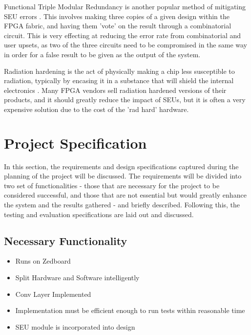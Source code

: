\documentclass[12pt]{article}
\begin{document}
Functional Triple Modular Redundancy is another popular method of mitigating SEU errors \cite{FTripleMR}. This involves making three copies of a given design within the FPGA fabric, and having them 'vote' on the result through a combinatorial circuit. This is very effecting at reducing the error rate from combinatorial and user upsets, as two of the three circuits need to be compromised in the same way in order for a false result to be given as the output of the system.

Radiation hardening is the act of physically making a chip less susceptible to radiation, typically by encasing it in a substance that will shield the internal electronics \cite{RadHardFpga}. Many FPGA vendors sell radiation hardened versions of their products, and it should greatly reduce the impact of SEUs, but it is often a very expensive solution due to the cost of the 'rad hard' hardware.

\newpage

\section{Project Specification}
\label{sec:ProjSpec}


In this section, the requirements and design specifications captured during the planning of the project will be discussed. The requirements will be divided into two set of functionalities - those that are necessary for the project to be considered successful, and those that are not essential but would greatly enhance the system and the results gathered - and briefly described. Following this, the testing and evaluation specifications are laid out and discussed.

\subsection{Necessary Functionality}
\label{sec:ProjSpec-Necessary}


\begin{itemize}
\item Runs on Zedboard
\item Split Hardware and Software intelligently
\item Conv Layer Implemented
\item Implementation must be efficient enough to run tests within reasonable time
\item SEU module is incorporated into design
\end{itemize}
\end{document}
